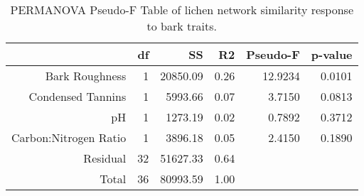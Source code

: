 \begin{table}[ht]
\centering
\begin{tabular}{rrrrrr}
  \hline
 & df & SS & R2 & Pseudo-F & p-value \\ 
  \hline
Bark Roughness & 1 & 20850.09 & 0.26 & 12.9234 & 0.0101 \\ 
  Condensed Tannins & 1 & 5993.66 & 0.07 & 3.7150 & 0.0813 \\ 
  pH & 1 & 1273.19 & 0.02 & 0.7892 & 0.3712 \\ 
  Carbon:Nitrogen Ratio & 1 & 3896.18 & 0.05 & 2.4150 & 0.1890 \\ 
  Residual & 32 & 51627.33 & 0.64 &  &  \\ 
  Total & 36 & 80993.59 & 1.00 &  &  \\ 
   \hline
\end{tabular}
\caption{PERMANOVA Pseudo-F Table of lichen network similarity response to bark traits.} 
\label{tab:cn_trait_perm}
\end{table}
